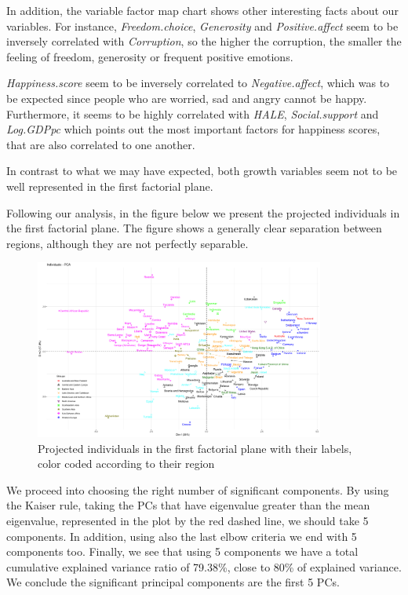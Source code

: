 \documentclass[12pt]{extarticle}
\begin{document}
In addition, the variable factor map chart shows other interesting facts about our variables. For instance, \textit{Freedom.choice}, \textit{Generosity} and \textit{Positive.affect} seem to be inversely correlated with \textit{Corruption}, so the higher the corruption, the smaller the feeling of freedom, generosity or frequent positive emotions.

\textit{Happiness.score} seem to be inversely correlated to \textit{Negative.affect}, which was to be expected since people who are worried, sad and angry cannot be happy. Furthermore, it seems to be highly correlated with \textit{HALE}, \textit{Social.support} and \textit{Log.GDPpc} which points out the most important factors for happiness scores, that are also correlated to one another.

In contrast to what we may have expected, both growth variables seem not to be well represented in the first factorial plane.

Following our analysis, in the figure below we present the projected individuals in the first factorial plane. The figure shows a generally clear separation between regions, although they are not perfectly separable.

\begin{figure}[H]
  \centering
    \includegraphics[width=0.85\textwidth]{figures/pca_ind.png}
    \caption{Projected individuals in the first factorial plane with their labels, color coded according to their region\label{fig:pca_ind}}
\end{figure}

We proceed into choosing the right number of significant components. By using the Kaiser rule, taking the PCs that have eigenvalue greater than the mean eigenvalue, represented in the plot by the red dashed line, we should take 5 components. In addition, using also the last elbow criteria we end with 5 components too. Finally, we see that using 5 components we have a total cumulative explained variance ratio of 79.38\%, close to 80\% of explained variance. We conclude the significant principal components are the first 5 PCs.
\end{document}
